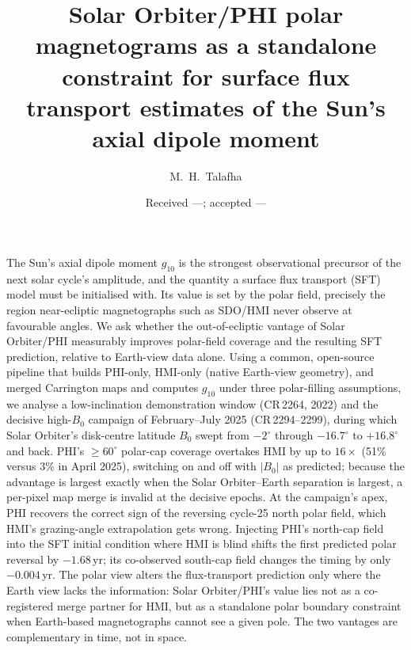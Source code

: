 \documentclass{aa}
\begin{document}
\title{Solar Orbiter/PHI polar magnetograms as a standalone constraint for surface flux transport estimates of the Sun's axial dipole moment}

\author{M.~H.~Talafha}


\date{Received ---; accepted ---}

\abstract
{The Sun's axial dipole moment $g_{10}$ is the strongest observational precursor of the next solar cycle's amplitude, and the quantity a surface flux transport (SFT) model must be initialised with. Its value is set by the polar field, precisely the region near-ecliptic magnetographs such as SDO/HMI never observe at favourable angles.}
{We ask whether the out-of-ecliptic vantage of Solar Orbiter/PHI measurably improves polar-field coverage and the resulting SFT prediction, relative to Earth-view data alone.}
{Using a common, open-source pipeline that builds PHI-only, HMI-only (native Earth-view geometry), and merged Carrington maps and computes $g_{10}$ under three polar-filling assumptions, we analyse a low-inclination demonstration window (CR\,2264, 2022) and the decisive high-$B_0$ campaign of February--July 2025 (CR\,2294--2299), during which Solar Orbiter's disk-centre latitude $B_0$ swept from $-2^{\circ}$ through $-16.7^{\circ}$ to $+16.8^{\circ}$ and back.}
{PHI's $\ge 60^{\circ}$ polar-cap coverage overtakes HMI by up to $16\times$ (51\% versus 3\% in April 2025), switching on and off with $|B_0|$ as predicted; because the advantage is largest exactly when the Solar Orbiter--Earth separation is largest, a per-pixel map merge is invalid at the decisive epochs. At the campaign's apex, PHI recovers the correct sign of the reversing cycle-25 north polar field, which HMI's grazing-angle extrapolation gets wrong. Injecting PHI's north-cap field into the SFT initial condition where HMI is blind shifts the first predicted polar reversal by $-1.68$\,yr; its co-observed south-cap field changes the timing by only $-0.004$\,yr.}
{The polar view alters the flux-transport prediction only where the Earth view lacks the information: Solar Orbiter/PHI's value lies not as a co-registered merge partner for HMI, but as a standalone polar boundary constraint when Earth-based magnetographs cannot see a given pole. The two vantages are complementary in time, not in space.}
\end{document}
